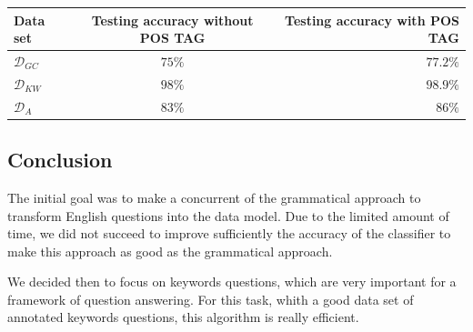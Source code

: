 \begin{center}
\begin{tabular}{|l|c|r|}
  \hline
  Data set & Testing accuracy  without POS TAG & Testing accuracy  with POS TAG \\
  \hline
  $\mathcal{D}_{GC}$ &  $75\%$& $77.2\%$  \\
  $\mathcal{D}_{KW}$ & $98\%$ & $98.9\%$ \\
  $\mathcal{D}_{A}$    & $83\%$ & $86\%$ \\
  \hline
\end{tabular}
\end{center}


\subsection{Conclusion}

The initial goal was to make a concurrent of the grammatical approach to transform English questions into the data model. Due to the limited amount of time, we did not succeed to improve sufficiently the accuracy of the classifier to make this approach as good as the grammatical approach.

We decided then to focus on keywords questions, which are very important for a framework of question answering. For this task, whith a good data set of annotated keywords questions, this algorithm is really efficient.

